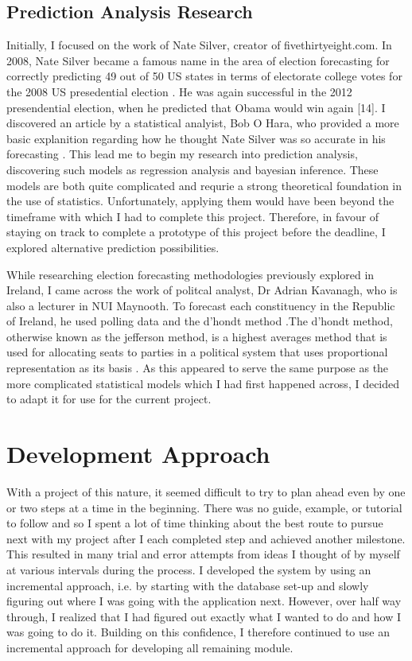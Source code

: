 \subsection{Prediction Analysis Research}
Initially, I focused on the work of Nate Silver, creator of fivethirtyeight.com. In 2008, Nate Silver became a famous name in the area of election forecasting for correctly predicting 49 out of 50 US states in terms of electorate college votes for the 2008 US presedential election \cite{natenytimes}. He was again successful in the 2012 presendential election, when he predicted that Obama would win again [14]. I discovered an article by a statistical analyist, Bob O Hara, who provided a more basic explanition regarding how he thought Nate Silver was so accurate in his forecasting \cite{bobohara}. This lead me to begin my research into prediction analysis, discovering such models as regression analysis and bayesian inference. These models are both quite complicated and requrie a strong theoretical foundation in the use of statistics. Unfortunately, applying them would have been beyond the timeframe with which I had to complete this project. Therefore, in favour of staying on track to complete a prototype of this project before the deadline, I explored alternative prediction possibilities.
 
While researching election forecasting methodologies previously explored in Ireland, I came across the work of politcal analyst, Dr Adrian Kavanagh, who is also a lecturer in NUI Maynooth. To forecast each constituency in the Republic of Ireland, he used polling data and the d’hondt method \cite{adrian}.The d’hondt method, otherwise known as the jefferson method, is a highest averages method that is used for allocating seats to parties in a political system that uses proportional representation as its basis \cite{dhondt}.  As this appeared to serve the same purpose as the more complicated statistical models which I had first happened across,  I decided to adapt it for use for the current project.
\section{Development Approach}
With a project of this nature, it seemed difficult to try to plan ahead even by one or two steps at a time in the beginning.  There was no guide, example, or tutorial to follow and so I spent a lot of time thinking about the best route to pursue next with my project after I each completed step and achieved another milestone. This resulted in many trial and error attempts from ideas I thought of by myself at various intervals during the process. I developed the system by using an incremental approach, i.e. by starting with the database set-up and slowly figuring out where I was going with the application next. However, over half way through, I realized that I had figured out exactly what I wanted to do and how I was going to do it. Building on this confidence, I therefore continued to use an incremental approach for developing all remaining module.

